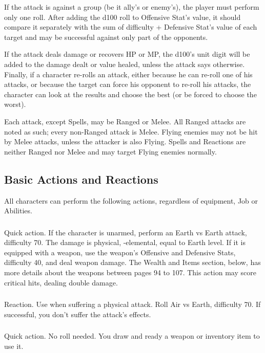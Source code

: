 \begin{multicols}{2}
If the attack is against a group (be it ally’s or enemy’s), the player must perform only one roll. After adding the d100 roll to Offensive Stat’s value, it should compare it separately with the sum of difficulty + Defensive Stat’s value of each target and may be successful against only part of the opponents.

If the attack deals damage or recovers HP or MP, the d100’s unit digit will be added to the damage dealt or value healed, unless the attack says otherwise. Finally, if a character re-rolls an attack, either because he can re-roll one of his attacks, or because the target can force his opponent to re-roll his attacks, the character can look at the results and choose the best (or be forced to choose the worst).

Each attack, except Spells, may be Ranged or Melee. All Ranged attacks are noted as such; every non-Ranged attack is Melee. Flying enemies may not be hit by Melee attacks, unless the attacker is also Flying. Spells and Reactions are neither Ranged nor Melee and may target Flying enemies normally.

\subsection{Basic Actions and Reactions}\label{subsec:basicactions}
All characters can perform the following actions, regardless of equipment, Job or Abilities.

\subsubsection{}
Quick action. If the character is unarmed, perform an Earth vs Earth attack, difficulty 70. The damage is physical, -elemental, equal to Earth level. If it is equipped with a weapon, use the weapon’s Offensive and Defensive Stats, difficulty 40, and deal weapon damage. The Wealth and Items section, below, has more details about the weapons between pages 94 to 107. This action may score critical hits, dealing double damage.

\subsubsection{}
Reaction. Use when suffering a physical attack. Roll Air vs Earth, difficulty 70. If successful, you don’t suffer the attack’s effects.

\subsubsection{}
Quick action. No roll needed. You draw and ready a weapon or inventory item to use it.


\end{multicols}
